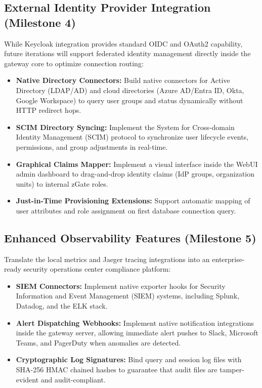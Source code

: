 \subsection{External Identity Provider Integration (Milestone 4)}

While Keycloak integration provides standard OIDC and OAuth2 capability, future iterations will support federated identity management directly inside the gateway core to optimize connection routing:
\begin{itemize}
    \item \textbf{Native Directory Connectors:} Build native connectors for Active Directory (LDAP/AD) and cloud directories (Azure AD/Entra ID, Okta, Google Workspace) to query user groups and status dynamically without HTTP redirect hops.
    \item \textbf{SCIM Directory Syncing:} Implement the System for Cross-domain Identity Management (SCIM) protocol to synchronize user lifecycle events, permissions, and group adjustments in real-time.
    \item \textbf{Graphical Claims Mapper:} Implement a visual interface inside the WebUI admin dashboard to drag-and-drop identity claims (IdP groups, organization units) to internal zGate roles.
    \item \textbf{Just-in-Time Provisioning Extensions:} Support automatic mapping of user attributes and role assignment on first database connection query.
\end{itemize}

\subsection{Enhanced Observability Features (Milestone 5)}

Translate the local metrics and Jaeger tracing integrations into an enterprise-ready security operations center compliance platform:
\begin{itemize}
    \item \textbf{SIEM Connectors:} Implement native exporter hooks for Security Information and Event Management (SIEM) systems, including Splunk, Datadog, and the ELK stack.
    \item \textbf{Alert Dispatching Webhooks:} Implement native notification integrations inside the gateway server, allowing immediate alert pushes to Slack, Microsoft Teams, and PagerDuty when anomalies are detected.
    \item \textbf{Cryptographic Log Signatures:} Bind query and session log files with SHA-256 HMAC chained hashes to guarantee that audit files are tamper-evident and audit-compliant.
\end{itemize}

